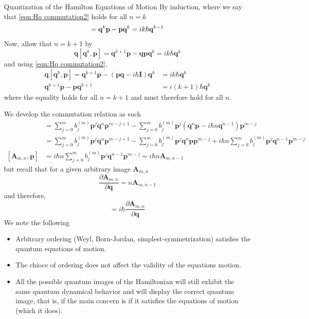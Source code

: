 \documentclass[aspectratio=169]{beamer}
\begin{document}
\begin{frame}[allowframebreaks]{Quantization of the Hamilton Equations of Motion}
		By induction, where we say that \ref{eqn:Hq commutation2} holds for all $n=k$
		\begin{equation}
			[\textbf{q}^k,\textbf{p}]=\textbf{q}^k\textbf{p}-\textbf{p}\textbf{q}^k=ik\hbar\textbf{\textbf{q}}^{k-1}
		\end{equation}
		Now, allow that $n=k+1$ by
		\begin{equation}
			\textbf{q}[\textbf{q}^k,\textbf{p}]=\textbf{q}^{k+1}\textbf{p}-\textbf{q}\textbf{p}\textbf{q}^{k}=ik\hbar\textbf{q}^{k}
		\end{equation}
		and using \ref{eqn:Hq commutation2},
		\begin{align}
			\textbf{q}[\textbf{q}^k,\textbf{p}]=\textbf{q}^{k+1}\textbf{p}-(\textbf{p}\textbf{q}-i\hbar\textbf{I})\textbf{q}^{k}&=ik\hbar\textbf{q}^{k} \\
			\textbf{q}^{k+1}\textbf{p}-\textbf{p}\textbf{q}^{k+1}&=i(k+1)\hbar\textbf{q}^{k}
		\end{align}
		where the equality holds for all $n=k+1$ and must therefore hold for all $n$.
		
		We develop the commutation relation as such
		\begin{align}
			[\textbf{A}_{m,n},\textbf{p}]&=\sum_{j=0}^mb_j^{(m)}\textbf{p}^j\textbf{q}^n\textbf{p}^{m-j+1}-\sum_{j=0}^mb_j^{(m)}\textbf{p}^{j}(\textbf{q}^n\textbf{p}-i\hbar n\textbf{q}^{n-1})\textbf{p}^{m-j} \\
			&=\sum_{j=0}^mb_j^{(m)}\textbf{p}^j\textbf{q}^n\textbf{p}^{m-j+1}-\sum_{j=0}^mb_j^{(m)}\textbf{p}^{j}\textbf{q}^n\textbf{p}\textbf{p}^{m-j}+i\hbar n\sum_{j=0}^mb_j^{(m)}\textbf{p}^{j}\textbf{q}^{n-1}\textbf{p}^{m-j} \\
			[\textbf{A}_{m,n},\textbf{p}]&=i\hbar n\sum_{j=0}^mb_j^{(m)}\textbf{p}^{j}\textbf{q}^{n-1}\textbf{p}^{m-j}=i\hbar n\textbf{A}_{m,n-1}
		\end{align}
		but recall that for a given arbitrary image $\textbf{A}_{m,n}$
		\begin{equation}
			\frac{\partial\textbf{A}_{m,n}}{\partial\textbf{q}}=n\textbf{A}_{m,n-1}
		\end{equation}
		and therefore,
		\begin{equation}
			[\textbf{A}_{m,n},\textbf{p}]=i\hbar\frac{\partial\textbf{A}_{m,n}}{\partial\textbf{q}}
		\end{equation}
		\newpage
		We note the following
		\begin{itemize}
			\item Arbitrary ordering (Weyl, Born-Jordan, simplest-symmetrization) satisfies the quantum equations of motion.
			\item The chioce of ordering does not affect the validity of the equations motion.
			\item All the possible quantum images of the Hamiltonian will still exhibit the same quantum dynamical behavior and will display the correct quantum image, that is, if the main concern is if it satisfies the equations of motion (which it does).
		\end{itemize}
	\end{frame}
	
\end{document}
